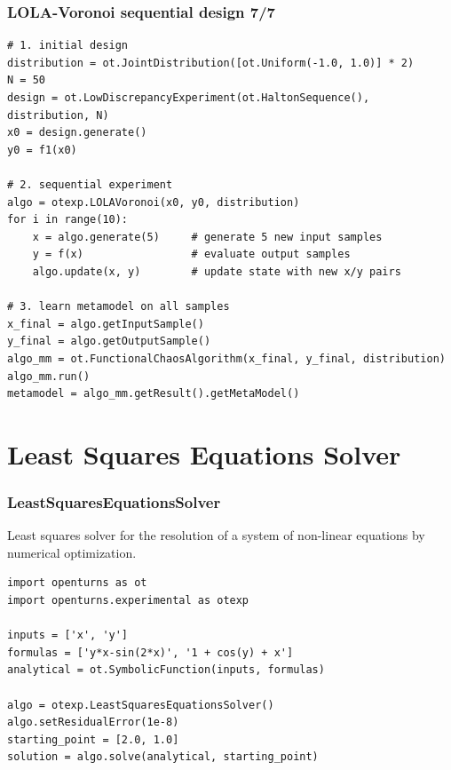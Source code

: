 \documentclass[aspectratio=169]{beamer}
\begin{document}

\begin{frame}[containsverbatim]
\frametitle{LOLA-Voronoi sequential design 7/7}

\begin{small}
\lstset{language=python}
\begin{lstlisting}
# 1. initial design
distribution = ot.JointDistribution([ot.Uniform(-1.0, 1.0)] * 2)
N = 50
design = ot.LowDiscrepancyExperiment(ot.HaltonSequence(), distribution, N)
x0 = design.generate()
y0 = f1(x0)

# 2. sequential experiment
algo = otexp.LOLAVoronoi(x0, y0, distribution)
for i in range(10):
    x = algo.generate(5)     # generate 5 new input samples
    y = f(x)                 # evaluate output samples
    algo.update(x, y)        # update state with new x/y pairs

# 3. learn metamodel on all samples
x_final = algo.getInputSample()
y_final = algo.getOutputSample()
algo_mm = ot.FunctionalChaosAlgorithm(x_final, y_final, distribution)
algo_mm.run()
metamodel = algo_mm.getResult().getMetaModel()
\end{lstlisting}
\end{small}


\end{frame}



\section{Least Squares Equations Solver}

\begin{frame}[containsverbatim]
\frametitle{LeastSquaresEquationsSolver}

Least squares solver for the resolution of a system of non-linear equations by numerical optimization.

\begin{small}
\lstset{language=python}
\begin{lstlisting}
import openturns as ot
import openturns.experimental as otexp

inputs = ['x', 'y']
formulas = ['y*x-sin(2*x)', '1 + cos(y) + x']
analytical = ot.SymbolicFunction(inputs, formulas)

algo = otexp.LeastSquaresEquationsSolver()
algo.setResidualError(1e-8)
starting_point = [2.0, 1.0]
solution = algo.solve(analytical, starting_point)
\end{lstlisting}
\end{small}
\end{frame}
\end{document}
